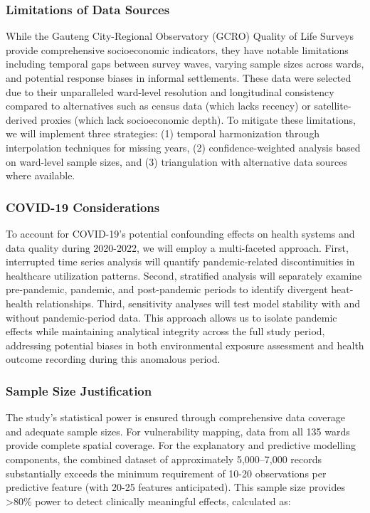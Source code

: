 \subsubsection{Limitations of Data Sources}
While the Gauteng City-Regional Observatory (GCRO) Quality of Life Surveys provide comprehensive socioeconomic indicators, they have notable limitations including temporal gaps between survey waves, varying sample sizes across wards, and potential response biases in informal settlements. These data were selected due to their unparalleled ward-level resolution and longitudinal consistency compared to alternatives such as census data (which lacks recency) or satellite-derived proxies (which lack socioeconomic depth). To mitigate these limitations, we will implement three strategies: (1) temporal harmonization through interpolation techniques for missing years, (2) confidence-weighted analysis based on ward-level sample sizes, and (3) triangulation with alternative data sources where available.

\subsubsection{COVID-19 Considerations}
To account for COVID-19's potential confounding effects on health systems and data quality during 2020-2022, we will employ a multi-faceted approach. First, interrupted time series analysis will quantify pandemic-related discontinuities in healthcare utilization patterns. Second, stratified analysis will separately examine pre-pandemic, pandemic, and post-pandemic periods to identify divergent heat-health relationships. Third, sensitivity analyses will test model stability with and without pandemic-period data. This approach allows us to isolate pandemic effects while maintaining analytical integrity across the full study period, addressing potential biases in both environmental exposure assessment and health outcome recording during this anomalous period.

\subsubsection{Sample Size Justification}
The study's statistical power is ensured through comprehensive data coverage and adequate sample sizes. For vulnerability mapping, data from all 135 wards provide complete spatial coverage. For the explanatory and predictive modelling components, the combined dataset of approximately 5,000--7,000 records substantially exceeds the minimum requirement of 10-20 observations per predictive feature (with 20-25 features anticipated). This sample size provides >80\% power to detect clinically meaningful effects, calculated as:

